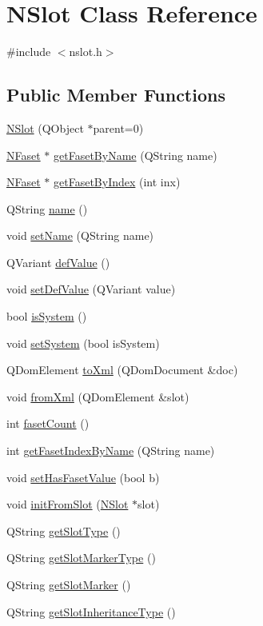 \hypertarget{class_n_slot}{
\section{NSlot Class Reference}
\label{class_n_slot}
}


{\ttfamily \#include $<$nslot.h$>$}

\subsection*{Public Member Functions}
\begin{DoxyCompactItemize}
\item 
\hyperlink{class_n_slot_a34247b6ead1576076fa153a28a65c5a8}{NSlot} (QObject $\ast$parent=0)
\item 
\hyperlink{class_n_faset}{NFaset} $\ast$ \hyperlink{class_n_slot_a8df968db21b63acbd31c0b51b968d60a}{getFasetByName} (QString name)
\item 
\hyperlink{class_n_faset}{NFaset} $\ast$ \hyperlink{class_n_slot_a9682dc3828f4595bcc475241dbb12898}{getFasetByIndex} (int inx)
\item 
QString \hyperlink{class_n_slot_a550f80343dd12602527dab7091810c58}{name} ()
\item 
void \hyperlink{class_n_slot_aed9566a09b6eda26740bc119f5ad430d}{setName} (QString name)
\item 
QVariant \hyperlink{class_n_slot_a15b8a930c928f6d43f2f1b03b3a99e61}{defValue} ()
\item 
void \hyperlink{class_n_slot_a8c543c9105103afbad44ab9ae19df018}{setDefValue} (QVariant value)
\item 
bool \hyperlink{class_n_slot_ac28465a019d1d5cc9152b06dd6ec9f47}{isSystem} ()
\item 
void \hyperlink{class_n_slot_ae32ff6b0b90bcf64ce6b9aa231f2770b}{setSystem} (bool isSystem)
\item 
QDomElement \hyperlink{class_n_slot_a0456f84d3b462208124ffbf2f63db406}{toXml} (QDomDocument \&doc)
\item 
void \hyperlink{class_n_slot_a7b0acdd380437a32cf68f6e82d530de9}{fromXml} (QDomElement \&slot)
\item 
int \hyperlink{class_n_slot_a891dfba51f530fb94df6f608bc0a8064}{fasetCount} ()
\item 
int \hyperlink{class_n_slot_a8a810a5a30fe3e69ddc132d3b6f521a3}{getFasetIndexByName} (QString name)
\item 
void \hyperlink{class_n_slot_a64ace57c2861fc3734fa53581f656da1}{setHasFasetValue} (bool b)
\item 
void \hyperlink{class_n_slot_ad5770f6c506df21c0674ed8fd7d5d7c5}{initFromSlot} (\hyperlink{class_n_slot}{NSlot} $\ast$slot)
\item 
QString \hyperlink{class_n_slot_a0952a0e1a5954b878aa15daadd5d93cc}{getSlotType} ()
\item 
QString \hyperlink{class_n_slot_a4a205c788ed7679f52791a5f3ce9262e}{getSlotMarkerType} ()
\item 
QString \hyperlink{class_n_slot_a112f70fd36c0f4cdda3c338bf2e6acae}{getSlotMarker} ()
\item 
QString \hyperlink{class_n_slot_abdefae3186a6107db4eeee1175ca85be}{getSlotInheritanceType} ()
\end{DoxyCompactItemize}
